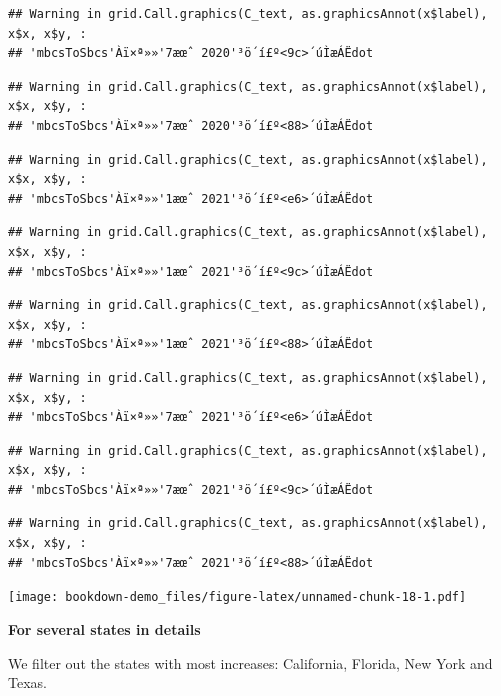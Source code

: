 \documentclass[
]{book}
\begin{document}
\begin{verbatim}
## Warning in grid.Call.graphics(C_text, as.graphicsAnnot(x$label), x$x, x$y, :
## 'mbcsToSbcs'Àï×ª»»'7æœˆ 2020'³ö´í£º<9c>´úÌæÁËdot
\end{verbatim}

\begin{verbatim}
## Warning in grid.Call.graphics(C_text, as.graphicsAnnot(x$label), x$x, x$y, :
## 'mbcsToSbcs'Àï×ª»»'7æœˆ 2020'³ö´í£º<88>´úÌæÁËdot
\end{verbatim}

\begin{verbatim}
## Warning in grid.Call.graphics(C_text, as.graphicsAnnot(x$label), x$x, x$y, :
## 'mbcsToSbcs'Àï×ª»»'1æœˆ 2021'³ö´í£º<e6>´úÌæÁËdot
\end{verbatim}

\begin{verbatim}
## Warning in grid.Call.graphics(C_text, as.graphicsAnnot(x$label), x$x, x$y, :
## 'mbcsToSbcs'Àï×ª»»'1æœˆ 2021'³ö´í£º<9c>´úÌæÁËdot
\end{verbatim}

\begin{verbatim}
## Warning in grid.Call.graphics(C_text, as.graphicsAnnot(x$label), x$x, x$y, :
## 'mbcsToSbcs'Àï×ª»»'1æœˆ 2021'³ö´í£º<88>´úÌæÁËdot
\end{verbatim}

\begin{verbatim}
## Warning in grid.Call.graphics(C_text, as.graphicsAnnot(x$label), x$x, x$y, :
## 'mbcsToSbcs'Àï×ª»»'7æœˆ 2021'³ö´í£º<e6>´úÌæÁËdot
\end{verbatim}

\begin{verbatim}
## Warning in grid.Call.graphics(C_text, as.graphicsAnnot(x$label), x$x, x$y, :
## 'mbcsToSbcs'Àï×ª»»'7æœˆ 2021'³ö´í£º<9c>´úÌæÁËdot
\end{verbatim}

\begin{verbatim}
## Warning in grid.Call.graphics(C_text, as.graphicsAnnot(x$label), x$x, x$y, :
## 'mbcsToSbcs'Àï×ª»»'7æœˆ 2021'³ö´í£º<88>´úÌæÁËdot
\end{verbatim}

\texttt{[image: bookdown-demo\_files/figure-latex/unnamed-chunk-18-1.pdf]}

\textbf{For several states in details}

We filter out the states with most increases: California, Florida, New York and Texas.
\end{document}

